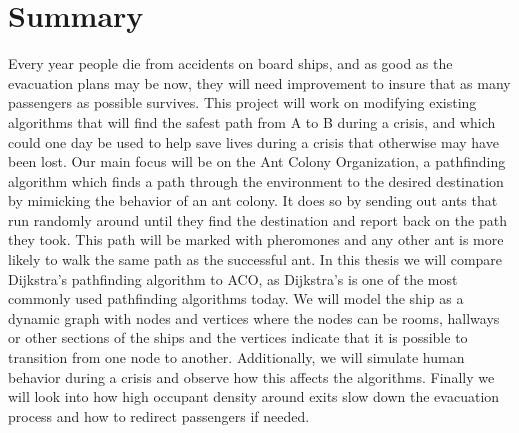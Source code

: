 \chapter{Summary}
\label{ch:summary}


Every year people die from accidents on board ships, and as good as the evacuation plans may be now, they will need improvement to insure that as many passengers as possible survives. This project will work on modifying existing algorithms that will find the safest path from A to B during a crisis, and which could one day be used to help save lives during a crisis that otherwise may have been lost. Our main focus will be on the Ant Colony Organization, a pathfinding algorithm which finds a path through the environment to the desired destination by mimicking the behavior of an ant colony. It does so by sending out ants that run randomly around until they find the destination and report back on the path they took. This path will be marked with pheromones and any other ant is more likely to walk the same path as the successful ant. In this thesis we will compare Dijkstra's pathfinding algorithm to ACO, as Dijkstra's is one of the most commonly used pathfinding algorithms today. We will model the ship as a dynamic graph with nodes and vertices where the nodes can be rooms, hallways or other sections of the ships and the vertices indicate that it is possible to transition from one node to another. Additionally, we will simulate human behavior during a crisis and observe how this affects the algorithms. Finally we will look into how high occupant density around exits slow down the evacuation process and how to redirect passengers if needed.